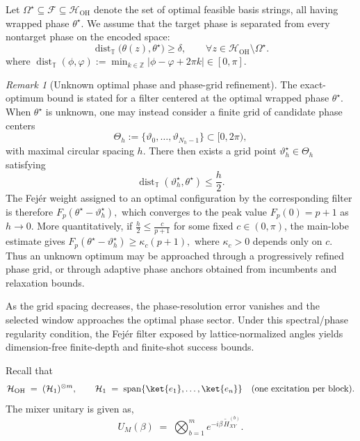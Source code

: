 \documentclass[a4paper,unpublished,onecolumn,11pt]{quantumarticle}
\theoremstyle{definition}
\theoremstyle{remark}
\newtheorem{remark}[theorem]{Remark}
\newcommand{\OH}{\mathcal{H}_{\mathrm{OH}}}
\begin{document}
Let \(\Omega^\star\subseteq\mathcal F\subseteq\mathcal H_{\mathrm{OH}}\)
denote the set of optimal feasible basis strings, all having wrapped
phase \(\theta^\star\). We assume that the target phase is separated
from every nontarget phase on the encoded space:
\begin{equation}
\label{eq:phase-gap-again}
\operatorname{dist}_{\mathbb T}
\bigl(\theta(z),\theta^\star\bigr)
\ge \delta,
\qquad
\forall z\in
\mathcal H_{\mathrm{OH}}\setminus\Omega^\star .
\end{equation}
where
\(
\operatorname{dist}_{\mathbb T}(\phi,\varphi)
:=
\min_{k\in\mathbb Z}
|\phi-\varphi+2\pi k|
\in[0,\pi].
\)




\begin{remark}[Unknown optimal phase and phase-grid refinement]
\label{rem:unknown-optimal-phase}
The exact-optimum bound is stated for a filter centered at the optimal
wrapped phase $\theta^\star$. When $\theta^\star$ is unknown, one may
instead consider a finite grid of candidate phase centers
\[
\Theta_h:=\{\vartheta_0,\ldots,\vartheta_{N_h-1}\}
\subset[0,2\pi),
\]
with maximal circular spacing $h$. There then exists a grid point
$\vartheta_h^\star\in\Theta_h$ satisfying
\[
\operatorname{dist}_{\mathbb T}
(\vartheta_h^\star,\theta^\star)
\le \frac{h}{2}.
\]
The Fej\'er weight assigned to an optimal configuration by the
corresponding filter is therefore \(
F_p(\theta^\star-\vartheta_h^\star),
\)
which converges to the peak value $F_p(0)=p+1$ as $h\to0$. More
quantitatively, if \(
\frac{h}{2}\le \frac{c}{p+1}
\)
for some fixed $c\in(0,\pi)$, the main-lobe estimate gives \(
F_p(\theta^\star-\vartheta_h^\star)
\ge \kappa_c(p+1),
\)
where $\kappa_c>0$ depends only on $c$. Thus an unknown optimum may be approached through a progressively
refined phase grid, or through adaptive phase anchors obtained from
incumbents and relaxation bounds. 

\end{remark}

 As the grid spacing decreases, the phase-resolution error vanishes and the selected window approaches the optimal phase sector. Under this spectral/phase regularity condition, the Fej\'er filter exposed by lattice-normalized angles yields dimension-free finite-depth and finite-shot success bounds.


Recall that
\[
\OH \;=\; (\mathcal H_1)^{\otimes m},
\qquad
\mathcal H_1 \;=\; \mathrm{span}\{\ket{e_1},\dots,\ket{e_n}\}
\quad\text{(one excitation per block)}.
\]
The mixer unitary is given as,
      \[
      U_M(\beta) \;=\; \bigotimes_{b=1}^{m} e^{-i\beta\,\widetilde H_{XY}^{(b)}}.
      \]
     
\end{document}
